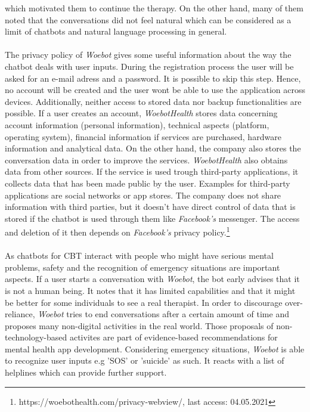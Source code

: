\documentclass[sigconf, nonacm]{acmart}
\begin{document}
which motivated them to continue the therapy. On the other hand, many of them noted that the conversations did not feel natural which can be considered as a limit of chatbots
and natural language processing in general.\cite{Fitzpatrick2017}
\\\\
The privacy policy of \emph{Woebot} gives some useful information about the way the chatbot deals with user inputs. 
During the registration process the user will be asked for an e-mail adress and a password. It is possible to skip
this step. Hence, no account will be created and the user wont be able to use the application across devices. 
Additionally, neither access to stored data nor backup functionalities are possible. If a user creates an account, \emph{WoebotHealth} stores
data concerning account information (personal information), technical aspects (platform, operating system), financial information if 
services are purchased, hardware information and analytical data. On the other hand, the company also stores the conversation data in order
to improve the services. \emph{WoebotHealth} also obtains data from other sources. If the service is used trough third-party applications, 
it collects data that has been made public by the user. Examples for third-party applications are social networks or app stores. 
The company does not share information with third parties, but it doesn't have direct control of data that is stored if the chatbot
is used through them like \emph{Facebook's} messenger. The access and deletion of it then depends on \emph{Facebook's} privacy policy.\footnote{https://woebothealth.com/privacy-webview/, last access: 04.05.2021}
\\\\
As chatbots for CBT interact with people who might have serious mental problems, safety and the recognition of emergency situations are important
aspects. If a user starts a conversation with \emph{Woebot}, the bot early advises that it is not a human being. It notes that it has limited capabilities and that it might 
be better for some individuals to see a real therapist. In order to discourage over-reliance, \emph{Woebot} tries to end conversations after a certain amount of time and proposes many non-digital activities in the real world.
Those proposals of non-technology-based activites are part of evidence-based recommendations for mental health app development\cite{Bakker2016}.
Considering emergency situations, \emph{Woebot} is able to recognize user inputs e.g 'SOS' or 'suicide' as such. It reacts with a list of helplines
which can provide further support.\cite{Kretzschmar2019}
\end{document}
